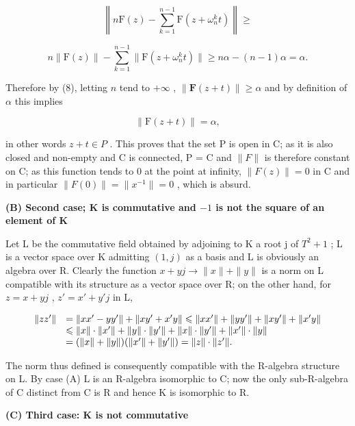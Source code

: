 \[
\left\| n \mathrm{F} (z) - \sum_ {k = 1} ^ {n - 1} \mathrm{F} (z + \omega_ {n} ^ {k} t) \right\| \geqslant
\]

\[
n \| \mathrm{F} (z) \| - \sum_ {k = 1} ^ {n - 1} \| \mathrm{F} (z + \omega_ {n} ^ {k} t) \| \geqslant n \alpha - (n - 1) \alpha = \alpha .
\]

Therefore by (8), letting \(n\) tend to \(+\infty\) , \(\| \mathbf{F}(z + t) \| \geqslant \alpha\) and by definition of \(\alpha\) this implies

\[
\| \mathrm{F} (z + t) \| = \alpha ,
\]

in other words \(z + t \in P\) . This proves that the set P is open in C; as it is also closed and non-empty and C is connected, P = C and \(\|F\|\) is therefore constant on C; as this function tends to 0 at the point at infinity, \(\|F(z)\| = 0\) in C and in particular \(\|F(0)\| = \|x^{-1}\| = 0\) , which is absurd.

\textbf{(B) Second case; \(\mathbf{K}\) is commutative and \(-1\) is not the square of an element of \(\mathbf{K}\)}\par

Let L be the commutative field obtained by adjoining to K a root j of \(T^{2} + 1\) ; L is a vector space over K admitting \((1, j)\) as a basis and L is obviously an algebra over R. Clearly the function \(x + yj \to \|x\| + \|y\|\) is a norm on L compatible with its structure as a vector space over R; on the other hand, for \(z = x + yj\) , \(z' = x' + y'j\) in L,

\[
\begin{array}{r l} \| z z ^ {\prime} \| & = \| x x ^ {\prime} - y y ^ {\prime} \| + \| x y ^ {\prime} + x ^ {\prime} y \| \leqslant \| x x ^ {\prime} \| + \| y y ^ {\prime} \| + \| x y ^ {\prime} \| + \| x ^ {\prime} y \| \\ & \leqslant \| x \| \cdot \| x ^ {\prime} \| + \| y \| \cdot \| y ^ {\prime} \| + \| x \| \cdot \| y ^ {\prime} \| + \| x ^ {\prime} \| \cdot \| y \| \\ & = (\| x \| + \| y \|) (\| x ^ {\prime} \| + \| y ^ {\prime} \|) = \| z \| \cdot \| z ^ {\prime} \|. \end{array}
\]

The norm thus defined is consequently compatible with the R-algebra structure on L. By case (A) L is an R-algebra isomorphic to C; now the only sub-R-algebra of C distinct from C is R and hence K is isomorphic to R.

\textbf{(C) Third case: K is not commutative}\par

